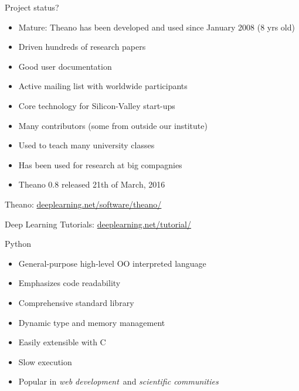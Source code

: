 \documentclass[utf8x,xcolor=pdftex,dvipsnames,table]{beamer}
\begin{document}

\begin{frame}{Project status?}
  \begin{itemize}
    \item Mature: Theano has been developed and used since January 2008 (8 yrs old)
    \item Driven hundreds of research papers %
    \item Good user documentation
    \item Active mailing list with worldwide participants
    \item Core technology for Silicon-Valley start-ups
    \item Many contributors (some from outside our institute)
    \item Used to teach many university classes
    \item Has been used for research at big compagnies
    \item Theano 0.8 released 21th of March, 2016
  \end{itemize}
  Theano: \url{deeplearning.net/software/theano/}

  Deep Learning Tutorials: \url{deeplearning.net/tutorial/}
\end{frame}

\begin{frame}{Python}
  \begin{itemize}
  \item General-purpose high-level OO interpreted language
  \item Emphasizes code readability
  \item Comprehensive standard library
  \item Dynamic type and memory management
  \item Easily extensible with C
  \item Slow execution
  \item Popular in {\em web development}\ and {\em scientific communities}
  \end{itemize}
\end{frame}
\end{document}
